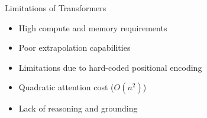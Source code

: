 \begin{frame}{Limitations of Transformers}
  \begin{itemize}
    \item[$\blacktriangleright$] High compute and memory requirements
    \item[$\blacktriangleright$] Poor extrapolation capabilities
    \item[$\blacktriangleright$] Limitations due to hard-coded positional encoding
    \item[$\blacktriangleright$] Quadratic attention cost ($O(n^2)$)
    \item[$\blacktriangleright$] Lack of reasoning and grounding
  \end{itemize}
\end{frame}


